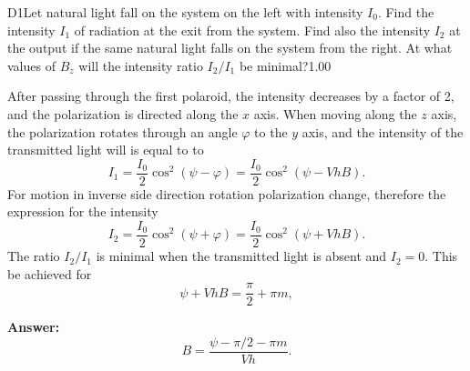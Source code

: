 \documentclass[11pt,a4paper]{article}
\begin{document}
\begin{solcard}{D1}{Let natural light fall on the system on the left with intensity $I_0$. Find the intensity $I_1$ of radiation at the exit from the system. Find also the intensity $I_2$ at the output if the same natural light falls on the system from the right. At what values of $B_z$ will the intensity ratio $I_2/I_1$ be minimal?}{1.00}

After passing through the first polaroid, the intensity decreases by a factor of 2, and the polarization is directed along the $x$ axis. When moving along the $z$ axis, the polarization rotates through an angle $\varphi$ to the $y$ axis, and the intensity of the transmitted light will is equal to to $$ I_1 = \frac{I_0}{2} \cos^2 (\psi - \varphi) = \frac{I_0}{2} \cos^2 (\psi - V h B). $$For motion in inverse side direction rotation polarization change, therefore the expression for the intensity $$ I_2 = \frac{I_0}{2} \cos^2 (\psi + \varphi) = \frac{I_0}{2} \cos^2 (\psi + V h B). $$The ratio $I_2/I_1$ is minimal when the transmitted light is absent and $I_2 = 0$. This be achieved for $$ \psi + Vh B = \frac{\pi }{2} + \pi m, $$

\par\smallskip\noindent\textbf{Answer:} $$ B = \frac{\psi - \pi/2 - \pi m}{V h}. $$
\end{solcard}
\end{document}
